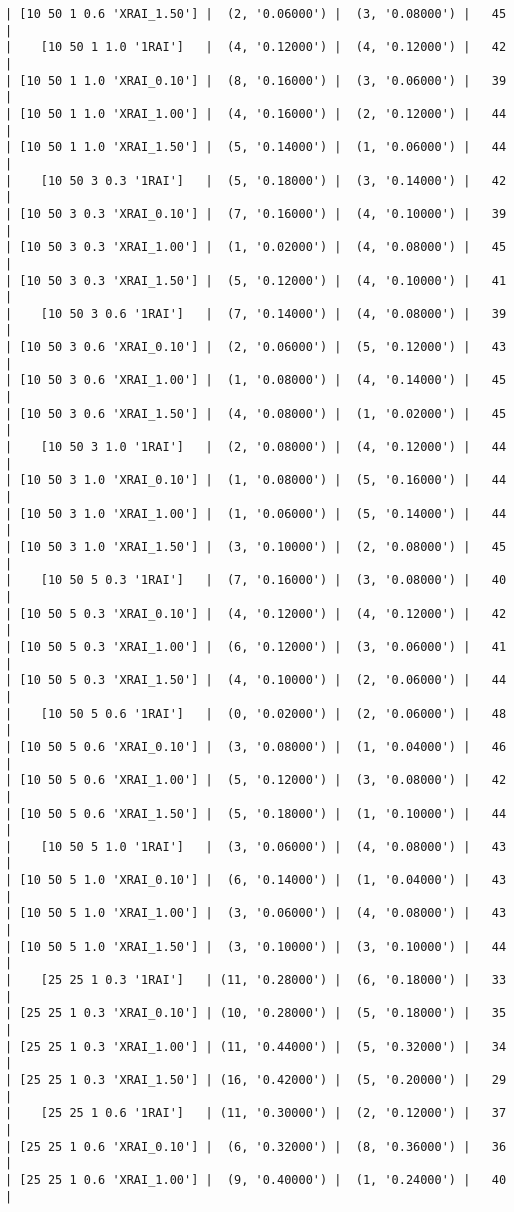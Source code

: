 \documentclass{article}
\begin{document}
\begin{verbatim}
| [10 50 1 0.6 'XRAI_1.50'] |  (2, '0.06000') |  (3, '0.08000') |   45  |
|    [10 50 1 1.0 '1RAI']   |  (4, '0.12000') |  (4, '0.12000') |   42  |
| [10 50 1 1.0 'XRAI_0.10'] |  (8, '0.16000') |  (3, '0.06000') |   39  |
| [10 50 1 1.0 'XRAI_1.00'] |  (4, '0.16000') |  (2, '0.12000') |   44  |
| [10 50 1 1.0 'XRAI_1.50'] |  (5, '0.14000') |  (1, '0.06000') |   44  |
|    [10 50 3 0.3 '1RAI']   |  (5, '0.18000') |  (3, '0.14000') |   42  |
| [10 50 3 0.3 'XRAI_0.10'] |  (7, '0.16000') |  (4, '0.10000') |   39  |
| [10 50 3 0.3 'XRAI_1.00'] |  (1, '0.02000') |  (4, '0.08000') |   45  |
| [10 50 3 0.3 'XRAI_1.50'] |  (5, '0.12000') |  (4, '0.10000') |   41  |
|    [10 50 3 0.6 '1RAI']   |  (7, '0.14000') |  (4, '0.08000') |   39  |
| [10 50 3 0.6 'XRAI_0.10'] |  (2, '0.06000') |  (5, '0.12000') |   43  |
| [10 50 3 0.6 'XRAI_1.00'] |  (1, '0.08000') |  (4, '0.14000') |   45  |
| [10 50 3 0.6 'XRAI_1.50'] |  (4, '0.08000') |  (1, '0.02000') |   45  |
|    [10 50 3 1.0 '1RAI']   |  (2, '0.08000') |  (4, '0.12000') |   44  |
| [10 50 3 1.0 'XRAI_0.10'] |  (1, '0.08000') |  (5, '0.16000') |   44  |
| [10 50 3 1.0 'XRAI_1.00'] |  (1, '0.06000') |  (5, '0.14000') |   44  |
| [10 50 3 1.0 'XRAI_1.50'] |  (3, '0.10000') |  (2, '0.08000') |   45  |
|    [10 50 5 0.3 '1RAI']   |  (7, '0.16000') |  (3, '0.08000') |   40  |
| [10 50 5 0.3 'XRAI_0.10'] |  (4, '0.12000') |  (4, '0.12000') |   42  |
| [10 50 5 0.3 'XRAI_1.00'] |  (6, '0.12000') |  (3, '0.06000') |   41  |
| [10 50 5 0.3 'XRAI_1.50'] |  (4, '0.10000') |  (2, '0.06000') |   44  |
|    [10 50 5 0.6 '1RAI']   |  (0, '0.02000') |  (2, '0.06000') |   48  |
| [10 50 5 0.6 'XRAI_0.10'] |  (3, '0.08000') |  (1, '0.04000') |   46  |
| [10 50 5 0.6 'XRAI_1.00'] |  (5, '0.12000') |  (3, '0.08000') |   42  |
| [10 50 5 0.6 'XRAI_1.50'] |  (5, '0.18000') |  (1, '0.10000') |   44  |
|    [10 50 5 1.0 '1RAI']   |  (3, '0.06000') |  (4, '0.08000') |   43  |
| [10 50 5 1.0 'XRAI_0.10'] |  (6, '0.14000') |  (1, '0.04000') |   43  |
| [10 50 5 1.0 'XRAI_1.00'] |  (3, '0.06000') |  (4, '0.08000') |   43  |
| [10 50 5 1.0 'XRAI_1.50'] |  (3, '0.10000') |  (3, '0.10000') |   44  |
|    [25 25 1 0.3 '1RAI']   | (11, '0.28000') |  (6, '0.18000') |   33  |
| [25 25 1 0.3 'XRAI_0.10'] | (10, '0.28000') |  (5, '0.18000') |   35  |
| [25 25 1 0.3 'XRAI_1.00'] | (11, '0.44000') |  (5, '0.32000') |   34  |
| [25 25 1 0.3 'XRAI_1.50'] | (16, '0.42000') |  (5, '0.20000') |   29  |
|    [25 25 1 0.6 '1RAI']   | (11, '0.30000') |  (2, '0.12000') |   37  |
| [25 25 1 0.6 'XRAI_0.10'] |  (6, '0.32000') |  (8, '0.36000') |   36  |
| [25 25 1 0.6 'XRAI_1.00'] |  (9, '0.40000') |  (1, '0.24000') |   40  |

\end{verbatim}
\end{document}

